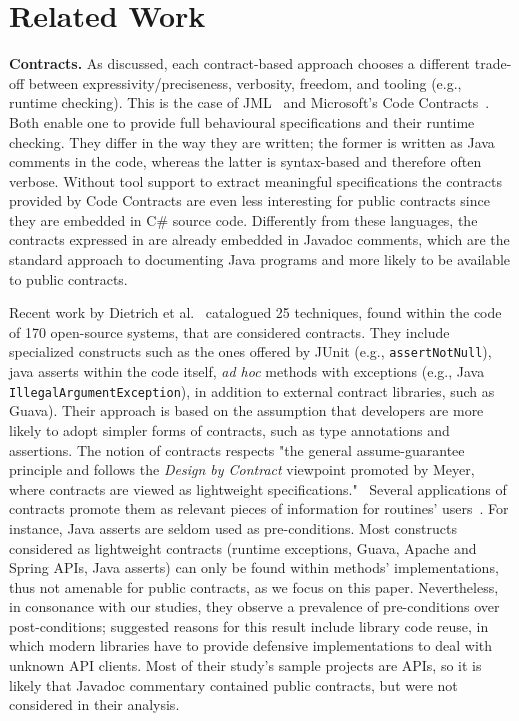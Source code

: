 \section{Related Work}
\label{sec:relatedWork}

\textbf{Contracts.} 
As discussed, each contract-based approach choo\-ses a different trade-off between expressivity/preciseness, verbosity, freedom, and tooling (e.g., runtime checking).
This is the case of JML~\cite{jml} and Microsoft's Code Contracts~\cite{codeContractsPaper}.
Both enable one to provide full behavioural specifications and their runtime checking. 
They differ in the way they are written; the former is written as Java comments in the code, whereas the latter is syntax-based and therefore often verbose. 
Without tool support to extract meaningful specifications the contracts provided by Code Contracts are even less interesting for public contracts since they are embedded in C\# source code. Differently from these languages, the contracts expressed in \contractjdoc{} are already embedded in Javadoc comments, which are the standard approach to documenting Java programs and more likely to be available to public contracts.

Recent work by Dietrich et al.~\cite{Dietrich2017} catalogued 25 techniques, found within the code of 170 open-source systems, that are considered contracts. They include specialized constructs such as the ones offered by JUnit (e.g., \texttt{assertNotNull}), java asserts within the code itself, \emph{ad hoc} methods with exceptions (e.g., Java \texttt{IllegalArgumentException}), in addition to external contract libraries, such as Guava). 
Their approach is based on the assumption that developers are more likely to adopt simpler forms of contracts, such as type annotations and assertions. The notion of contracts respects "the general assume-guarantee principle and follows the \emph{Design by Contract} viewpoint promoted by Meyer, where contracts are viewed as lightweight specifications."~\cite{dbc} 
Several applications of contracts promote them as relevant pieces of information for routines' users~\cite{docAnalysis}. For instance, Java asserts are seldom used as pre-conditions. Most constructs considered as lightweight contracts (runtime exceptions, Guava, Apache and Spring APIs, Java asserts) can only be found within methods' implementations, thus not amenable for public contracts, as we focus on this paper.
Nevertheless, in consonance with our studies, they observe a prevalence of pre-conditions over post-conditions; suggested reasons for this result include library code reuse, in which modern libraries have to provide defensive implementations to deal with unknown API clients. Most of their study's sample projects are APIs, so it is likely that Javadoc commentary contained public contracts, but were not considered in their analysis.


